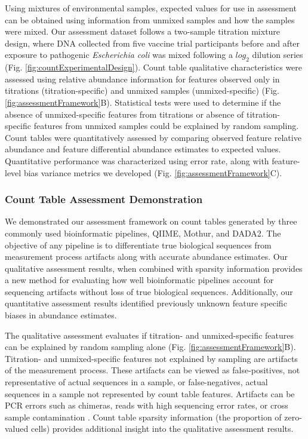 \documentclass{bmcart}
\begin{document}
Using mixtures of environmental samples, expected values for use in assessment
can be obtained using information from unmixed samples and how the samples were mixed.
Our assessment dataset follows a two-sample titration mixture design, where DNA collected from five vaccine trial participants before and
after exposure to pathogenic \emph{Escherichia coli}  was mixed following a \(log_2\) dilution
series (Fig. \ref{fig:countExperimentalDesign}).
Count table qualitative characteristics were assessed using relative abundance information for
features observed only in titrations (titration-specific) and unmixed samples (unmixed-specific) (Fig. \ref{fig:assessmentFramework}B).
Statistical tests were used to determine if the absence of unmixed-specific features from titrations or absence of titration-specific features from unmixed samples could be explained by random sampling.
Count tables were quantitatively assessed by comparing observed feature relative abundance and feature differential abundance estimates to expected values.
Quantitative performance was characterized using error rate, along with feature-level bias variance metrics we developed (Fig. \ref{fig:assessmentFramework}C).


\subsubsection*{Count Table Assessment Demonstration}
We demonstrated our assessment framework on count tables generated by three commonly used bioinformatic pipelines, QIIME, Mothur, and DADA2.
The objective of any pipeline is to differentiate true biological sequences from measurement process artifacts along with accurate abundance estimates.
Our qualitative assessment results, when combined with sparsity information provides a
new method for evaluating how well bioinformatic pipelines account for sequencing artifacts without loss of true biological sequences.
Additionally, our quantitative assessment results identified previously unknown feature specific biases in abundance estimates.

The qualitative assessment evaluates if titration- and unmixed-specific features can be explained by random sampling alone (Fig. \ref{fig:assessmentFramework}B).
Titration- and unmixed-specific features not explained by sampling are artifacts of the measurement process.
These artifacts can be viewed as false-positives, not representative of actual sequences in a sample,
or false-negatives, actual sequences in a sample not represented by count table features. 
Artifacts can be PCR errors such as chimeras, reads with high sequencing error rates, or cross sample contamination \cite{edgar2011uchime}\cite{Edgar2018-ss}\cite{damore2016}. 
Count table sparsity information (the proportion of zero-valued cells) provides
additional insight into the qualitative assessment results.
\end{document}
